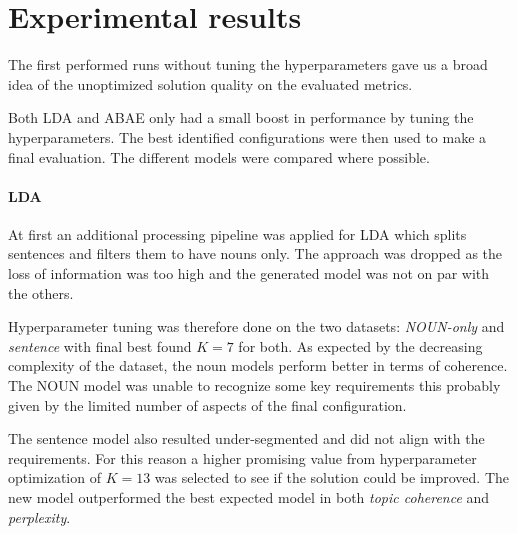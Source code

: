 \section{Experimental results}
The first performed runs without tuning the hyperparameters gave us a broad idea
of the unoptimized solution quality on the evaluated metrics.

Both LDA and ABAE only had a small boost in performance by tuning the hyperparameters.
The best identified configurations were then used to make a final evaluation.
The different models were compared where possible.

\paragraph{LDA}
At first an additional processing pipeline was applied for LDA which splits sentences and filters them to have nouns only.
The approach was dropped as the loss of information was too high and the generated model was not on par with the others.

Hyperparameter tuning was therefore done on the two datasets: \textit{NOUN-only} and \textit{sentence}
with final best found $K=7$ for both.
As expected by the decreasing complexity of the dataset, the noun models perform better in terms of coherence.
The NOUN model was unable to recognize some key requirements this probably given by the limited number of aspects of the final configuration.

The sentence model also resulted under-segmented and did not align with the requirements.
For this reason a higher promising value from hyperparameter optimization of $K=13$ was selected
to see if the solution could be improved.
The new model outperformed the best expected model in both \textit{topic coherence} and \textit{perplexity}.


